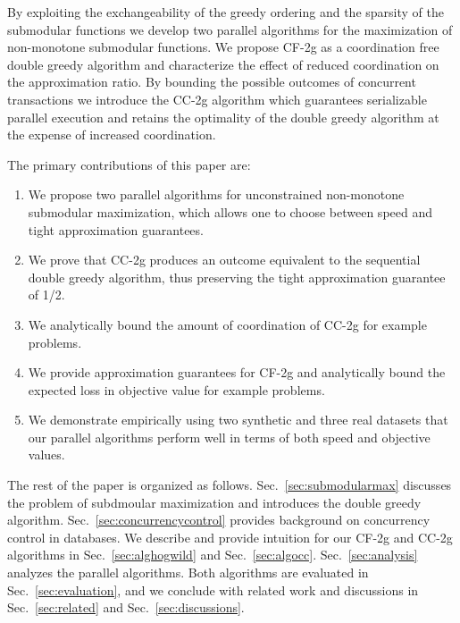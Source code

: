 \documentclass{article} %
\newcommand{\hogwild}{CF-2g}
\newcommand{\occ}{CC-2g}
\newcommand{\secref}[1]{Sec.~\ref{#1}}
\begin{document}
By exploiting the exchangeability of the greedy ordering and the sparsity of  the submodular functions we develop two parallel algorithms for the maximization of non-monotone submodular functions.
We propose \hogwild{} as a coordination free double greedy algorithm and characterize the effect of reduced coordination on the approximation ratio.
By bounding the possible outcomes of concurrent transactions we introduce the \occ{} algorithm which guarantees serializable parallel execution and retains the optimality of the double greedy algorithm at the expense of increased coordination.


The primary contributions of this paper are:
\begin{enumerate}
\item We propose two parallel algorithms for unconstrained non-monotone submodular maximization, which allows one to choose between speed and tight approximation guarantees.
\item We prove that \occ{} produces an outcome equivalent to the sequential double greedy algorithm, thus preserving the tight approximation guarantee of 1/2.
\item We analytically bound the amount of coordination of \occ{} for example problems.
\item We provide approximation guarantees for \hogwild{} and analytically bound the expected loss in objective value for example problems.
\item We demonstrate empirically using two synthetic and three real datasets that our parallel algorithms perform well in terms of both speed and objective values.
\end{enumerate}

The rest of the paper is organized as follows.
\secref{sec:submodularmax} discusses the problem of subdmoular maximization and introduces the double greedy algorithm.
\secref{sec:concurrencycontrol} provides background on concurrency control in databases.
We describe and provide intuition for our \hogwild{} and \occ{} algorithms in \secref{sec:alghogwild} and \secref{sec:algocc}.
\secref{sec:analysis} analyzes the parallel algorithms.
Both algorithms are evaluated in \secref{sec:evaluation}, and we conclude with related work and discussions in \secref{sec:related} and \secref{sec:discussions}.
\end{document}
